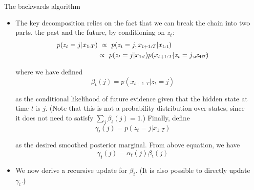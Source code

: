 \documentclass[10pt,mathserif]{beamer}
\begin{document}
\begin{frame}{The backwards algorithm}
\begin{itemize}
    \item The key decomposition relies on the fact that we can break the chain into two parts, the past and the future, by conditioning on $z_t$:
    \begin{equation}
        \begin{split}
            p(z_t = j|x_{1:T}) & \ \propto \ p(z_t = j,x_{t+1:T}|x_{1:t})\\
            & \propto \ p(z_t = j|x_{1:t})p(x_{t+1:T}|z_t = j, \cancel{x_{1:t}})
        \end{split}
    \end{equation}
    
    where we have defined 
    \begin{equation}
        \beta_t(j) = p(x_{t+1:T}|z_t =j)
    \end{equation}
    
    as the conditional likelihood of future evidence given that the hidden state at time $t$ is $j$.
    (Note that this is not a probability distribution over states, since it does not need to satisfy $\sum_j \beta_t(j) = 1$.) Finally, define
    \begin{equation}
        \gamma_t(j) = p(z_t = j|x_{1:T})
    \end{equation}
    
    as the desired smoothed posterior marginal. From above equation, we have
    \begin{equation}
         \gamma_t(j) = \alpha_t(j)\beta_t(j)
    \end{equation}
    
    \item We now derive a recursive update for $\beta_t$. (It is also possible to directly update $\gamma_t$.)
\end{itemize}
\end{frame}
\end{document}
